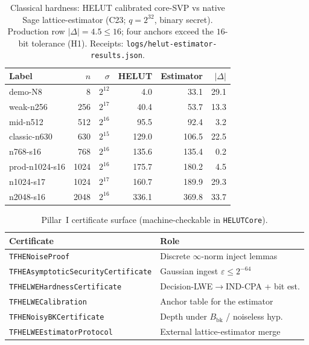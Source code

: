 \documentclass[11pt,a4paper]{article}
\begin{document}
\begin{table}[t]
\centering
\small
\begin{tabular}{@{}lrrrrr@{}}
\toprule
Label & $n$ & $\sigma$ & HELUT & Estimator & $|\Delta|$ \\
\midrule
demo-N8 & 8 & $2^{12}$ & 4.0 & 33.1 & 29.1 \\
weak-n256 & 256 & $2^{17}$ & 40.4 & 53.7 & 13.3 \\
mid-n512 & 512 & $2^{16}$ & 95.5 & 92.4 & 3.2 \\
classic-n630 & 630 & $2^{15}$ & 129.0 & 106.5 & 22.5 \\
n768-s16 & 768 & $2^{16}$ & 135.6 & 135.4 & 0.2 \\
prod-n1024-s16 & 1024 & $2^{16}$ & 175.7 & 180.2 & 4.5 \\
n1024-s17 & 1024 & $2^{17}$ & 160.7 & 189.9 & 29.3 \\
n2048-s16 & 2048 & $2^{16}$ & 336.1 & 369.8 & 33.7 \\
\bottomrule
\end{tabular}
\caption{Classical hardness: HELUT calibrated core-SVP vs native Sage
lattice-estimator (C23; $q=2^{32}$, binary secret). Production row
$|\Delta|{=}4.5\le 16$; four anchors exceed the $16$-bit tolerance (H1).
Receipts: \texttt{logs/helut-estimator-results.json}.}
\label{tab:hardness}
\end{table}

\begin{table}[t]
\centering
\small
\begin{tabular}{@{}ll@{}}
\toprule
Certificate & Role \\
\midrule
\texttt{TFHENoiseProof} & Discrete $\infty$-norm inject lemmas \\
\texttt{TFHEAsymptoticSecurityCertificate} & Gaussian ingest $\varepsilon\le 2^{-64}$ \\
\texttt{TFHELWEHardnessCertificate} & Decision-LWE$\to$IND-CPA + bit est. \\
\texttt{TFHELWECalibration} & Anchor table for the estimator \\
\texttt{TFHENoisyBKCertificate} & Depth under $B_{\mathrm{bk}}$ / noiseless hyp. \\
\texttt{TFHELWEEstimatorProtocol} & External lattice-estimator merge \\
\bottomrule
\end{tabular}
\caption{Pillar~I certificate surface (machine-checkable in \texttt{HELUTCore}).}
\label{tab:certs}
\end{table}
\end{document}
